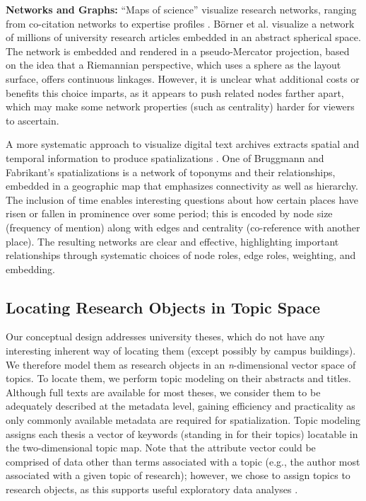 \documentclass[a4paper,UKenglish]{lipics-v2018}
\begin{document}
\noindent \textbf{Networks and Graphs:} “Maps of science”  visualize research networks, ranging from co-citation networks to expertise profiles \cite{Borner2012b}. Börner et al. visualize a network of millions of university research articles embedded in an abstract spherical %
space. 
The network is embedded and rendered in a pseudo-Mercator projection, based on the idea that a Riemannian perspective, which uses a sphere as the layout surface, offers continuous linkages. However, it is unclear what additional costs or benefits this choice imparts, as it appears to push related nodes farther apart, which may make some network properties (such as centrality) harder for viewers to ascertain.


A more systematic approach to visualize digital text archives extracts spatial and temporal information to produce spatializations \cite{Bruggmann2016b}. One of Bruggmann and Fabrikant's spatializations is a network of toponyms and their relationships, embedded in a geographic map that emphasizes connectivity as well as hierarchy. The inclusion of time enables interesting questions about how certain places have risen or fallen in prominence over some period; this is encoded by node size (frequency of mention) along with edges and centrality (co-reference with another place). The resulting networks are clear and effective, highlighting important relationships through systematic choices of node roles, edge roles, weighting, and embedding.

\subsection{Locating Research Objects in Topic Space}
Our conceptual design addresses university theses, which do not have any interesting inherent way of locating them (except possibly by campus buildings). We therefore model them as research objects in an \textit{n}-dimensional vector space of topics. To locate them, we perform topic modeling on their abstracts and titles. Although full texts are available for most theses, we consider them to be adequately described at the metadata level, gaining efficiency and practicality as only commonly available metadata are required for spatialization. Topic modeling assigns each thesis a vector of keywords (standing in for their topics) locatable in the two-dimensional topic map. Note that the attribute vector could be comprised of data other than terms associated with a topic (e.g., the author most associated with a given topic of research); however, we chose to assign topics to research objects, as this supports useful exploratory data analyses \cite{Blei2003c}. \newline
\end{document}
